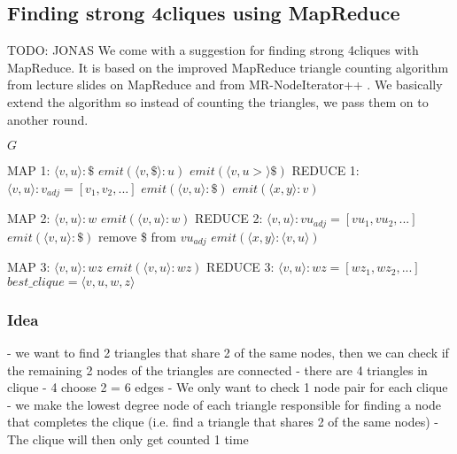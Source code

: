 \documentclass{article}
\begin{document}
\subsection{Finding strong 4cliques using MapReduce}
TODO: JONAS
We come with a suggestion for finding strong 4cliques with MapReduce. It is based on the improved MapReduce triangle counting algorithm from lecture slides on MapReduce \cite{lnMapReduce} and from MR-NodeIterator++ \cite{countingTriangles}. We basically extend the algorithm so instead of counting the triangles, we pass them on to another round.

\begin{algorithm}
\caption{$mr\_strong\_4clique\_finder$}
\begin{algorithmic}
\REQUIRE $G$
	
\REQUIRE MAP 1: $\langle v,u\rangle :\$$
		\STATE $emit(\langle v,\$\rangle :u)$
		\STATE $emit(\langle v,u>\rangle \$)$
	\ENDIF
\REQUIRE REDUCE 1: $\langle v,u\rangle :v_{adj} = [v_1,v_2,...]$
		\STATE $emit(\langle v,u \rangle:\$)$
					\STATE $emit(\langle x,y\rangle :v)$
				\ENDIF
			\ENDFOR
		\ENDFOR
	\ENDIF

\REQUIRE MAP 2: $\langle v,u\rangle :w$
	\STATE $emit(\langle v,u\rangle :w)$
\REQUIRE REDUCE 2: $\langle v,u\rangle : vu_{adj} = [vu_1,vu_2,...]$
		\STATE $emit(\langle v,u\rangle : \$)$
		\STATE remove \$ from $vu_{adj}$
	\ENDIF
				\STATE $emit(\langle x,y\rangle :\langle v,u\rangle)$
			\ENDIF
		\ENDFOR
	\ENDFOR

\REQUIRE MAP 3: $\langle v,u\rangle :wz$
	\STATE $emit(\langle v,u\rangle :wz)$
\REQUIRE REDUCE 3: $\langle v,u\rangle :wz = [wz_1,wz_2,...]$
				\STATE $best\_clique = \langle v,u,w,z\rangle$
			\ENDIF
		\ENDFOR
	\ENDIF
\end{algorithmic}
\end{algorithm}

\subsubsection{Idea}
- we want to find 2 triangles that share 2 of the same nodes, then we can check if the remaining 2 nodes of the triangles are connected
- there are 4 triangles in clique - 4 choose 2 = 6 edges
- We only want to check 1 node pair for each clique
- we make the lowest degree node of each triangle responsible for finding a node that completes the clique (i.e. find a triangle that shares 2 of the same nodes)
- The clique will then only get counted 1 time
\end{document}
